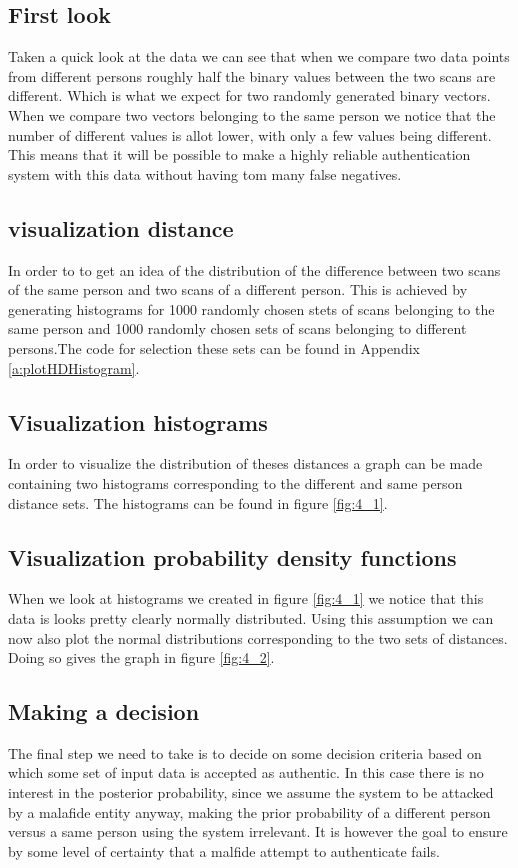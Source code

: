 \documentclass[10pt,a4paper]{article}
\begin{document}
\subsection{First look}
Taken a quick look at the data we can see that when we compare two data points from different persons roughly half the binary values between the two scans are different. Which is what we expect for two randomly generated binary vectors. When we compare two vectors belonging to the same person we notice that the number of different values is allot lower, with only a few values being different. This means that it will be possible to make a highly reliable authentication system with this data without having tom many false negatives.

\subsection{visualization distance}
In order to to get an idea of the distribution of the difference between two scans of the same person and two scans of a different person. This is achieved by generating histograms for 1000 randomly chosen stets of scans belonging to the same person and 1000 randomly chosen sets of scans belonging to different persons.The code for selection these sets can be found in Appendix \ref{a:plotHDHistogram}. 

\subsection{Visualization histograms}
In order to visualize the distribution of theses distances a graph can be made containing two histograms corresponding to the different and same person distance sets. The histograms can be found in figure \ref{fig:4_1}.

\subsection{Visualization probability density functions}
When we look at histograms we created in figure \ref{fig:4_1} we notice that this data is looks pretty clearly normally distributed. Using this assumption we can now also plot the normal distributions corresponding to the two sets of distances. Doing so gives the graph in figure \ref{fig:4_2}. 

\subsection{Making a decision}
The final step we need to take is to decide on some decision criteria based on which some set of input data is accepted as authentic. In this case there is no interest in the posterior probability, since we assume the system to be attacked by a malafide entity anyway, making the prior probability of a different person versus a same person using the system irrelevant. It is however the goal to ensure by some level of certainty that a malfide attempt to authenticate fails. 
\end{document}
